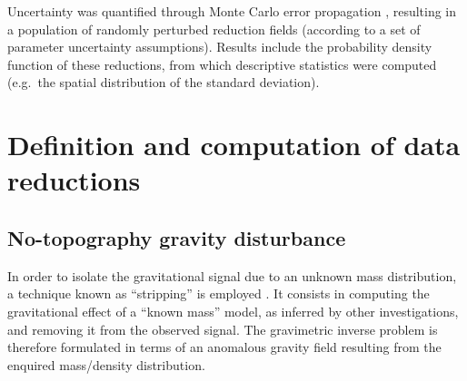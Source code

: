 Uncertainty was quantified through Monte Carlo error propagation \parencite{Aster2018}, resulting in a population of randomly perturbed reduction fields (according to a set of parameter uncertainty assumptions).
Results include the probability density function of these reductions, from which descriptive statistics were computed (e.g.~the spatial distribution of the standard deviation).


\section{Definition and computation of data reductions}
\label{s:SigIs:Defs}

\subsection{No-topography gravity disturbance}
\label{ss:SigIs:Defs:NETC}
In order to isolate the gravitational signal due to an unknown mass distribution, a technique known as ``stripping'' is employed \parencites{Vajda2008}{Tenzer2009}.
It consists in computing the gravitational effect of a ``known mass'' model, as inferred by other investigations, and removing it from the observed signal.
The gravimetric inverse problem is therefore formulated in terms of an anomalous gravity field resulting from the enquired mass/density distribution.

